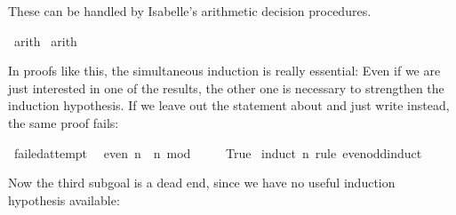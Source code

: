 \begin{isabellebody}
\begin{isamarkuptxt}
  \noindent These can be handled by Isabelle's arithmetic decision procedures.%
\end{isamarkuptxt}%
\isamarkuptrue%
\isamarkupfalse%
\ arith\isanewline
{}\isamarkupfalse%
\ arith\isanewline
{}\isamarkupfalse%
%
\endisatagproof
{\isafoldproof}%
%
\isadelimproof
%
\endisadelimproof
%
\begin{isamarkuptext}%
In proofs like this, the simultaneous induction is really essential:
  Even if we are just interested in one of the results, the other
  one is necessary to strengthen the induction hypothesis. If we leave
  out the statement about  and just write  instead,
  the same proof fails:%
\end{isamarkuptext}%
\isamarkuptrue%
\isamarkupfalse%
\ failed{}attempt{}\isanewline
\ \ {}even\ n\ {}\ {}n\ mod\ {}\ {}\ {}{}{}\isanewline
\ \ {}True{}\isanewline
%
\isadelimproof
%
\endisadelimproof
%
\isatagproof
{}\isamarkupfalse%
\ {}induct\ n\ rule{}\ even{}odd{}induct{}%
\begin{isamarkuptxt}%
\noindent Now the third subgoal is a dead end, since we have no
  useful induction hypothesis available:


\end{isamarkuptxt}
\end{isabellebody}
